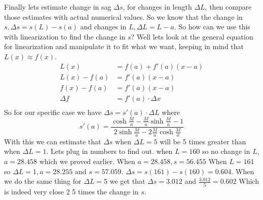 \documentclass[12pt]{article}
\begin{document}
\newline
\newline
Finally lets estimate change in sag $\Delta s$, for changes in length $\Delta L$, then compare those estimates with actual numerical values. So we know that the change in $s, \Delta s = s(L) - s(a)$ and changes in $L, \Delta L = L - a$. So how can we use this with linearization to find the change in $s$? Well lets look at the general equation for linearization and manipulate it to fit what we want, keeping in mind that $L(x) \approx f(x)$.
\begin{align} \nonumber
    L(x) &= f(a) + f'(a)(x-a)\\ \nonumber
    L(x)- f(a) &= f'(a)(x-a)\\ \nonumber
    f(x) - f(a) &= f'(a)(x-a)\\ \nonumber
    \Delta f &= f'(a) \cdot \Delta x\\ \nonumber
\end{align}
So for our specific case we have $\Delta s = s'(a) \cdot \Delta L$ where
\[s'(a) = \frac{\cosh{\frac{M}{a}} - \frac{M}{a} \sinh{\frac{M}{a}} -1}{2\sinh{\frac{M}{a}} - 2\frac{M}{a}\cosh{\frac{M}{a}}}\]
With this we can estimate that $\Delta s$ when $\Delta L = 5$ will be 5 times greater than when $\Delta L = 1$. Lets plug in numbers to find out. when $L = 160$ so no change in $L$, $a = 28.458$ which we proved earlier. When $a = 28.458, s = 56.455$ When $L = 161$ so $\Delta L = 1, a = 28.255$ and $s = 57.059$. $\Delta s = s(161) - s(160) = 0.604$. When we do the same thing for $\Delta L = 5$ we get that $\Delta s = 3.012$ and $\frac{3.012}{5} = 0.602$ Which is indeed very close 2 5 times the change in $s$.
\end{document}
